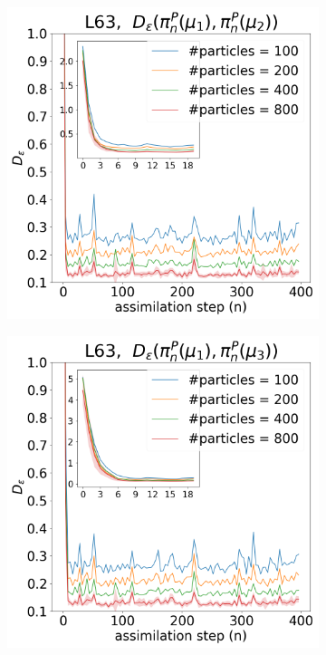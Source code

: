 \begin{figure}[!t]
\begin{subfigure}{0.3\textwidth}
\includegraphics[width=\columnwidth]{stability/plots/figures-BPF-L63-1-dist_1_vs_2.png}
\end{subfigure}\hspace{0mm}%
\begin{subfigure}{0.3\textwidth}
\includegraphics[width=\columnwidth]{stability/plots/figures-BPF-L63-1-dist_1_vs_3.png}

\end{subfigure}
\end{figure}
